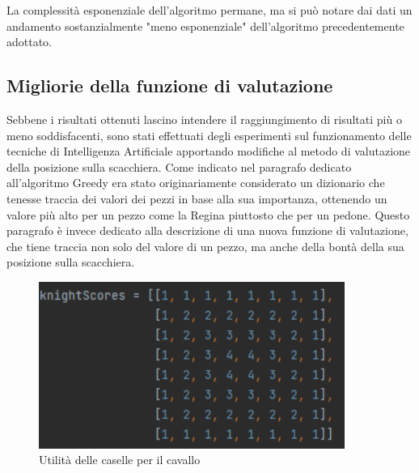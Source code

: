 La complessità esponenziale dell'algoritmo permane, ma si può notare dai dati un andamento sostanzialmente "meno esponenziale" dell'algoritmo precedentemente adottato.

\subsection{Migliorie della funzione di valutazione}
Sebbene i risultati ottenuti lascino intendere il raggiungimento di risultati più o meno soddisfacenti, sono stati effettuati degli esperimenti sul funzionamento delle tecniche di Intelligenza Artificiale apportando modifiche al metodo di valutazione della posizione sulla scacchiera. Come indicato nel paragrafo dedicato all'algoritmo Greedy era stato originariamente considerato un dizionario che tenesse traccia dei valori dei pezzi in base alla sua importanza, ottenendo un valore più alto per un pezzo come la Regina piuttosto che per un pedone. Questo paragrafo è invece dedicato alla descrizione di una nuova funzione di valutazione, che tiene traccia non solo del valore di un pezzo, ma anche della bontà della sua posizione sulla scacchiera.

\begin{figure}[!htb]
    \includegraphics[width=10cm]{frontmatter/figure/cavallo.pdf}
    \centering
    \caption{Utilità delle caselle per il cavallo}
    \label{fig:valore_pezzi}
\end{figure}

